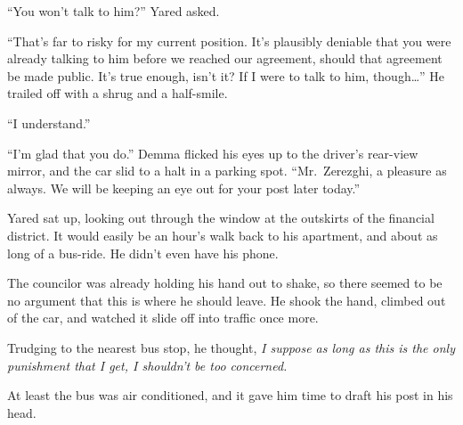 ``You won't talk to him?'' Yared asked.

``That's far to risky for my current position. It's plausibly deniable that you were already talking to him before we reached our agreement, should that agreement be made public. It's true enough, isn't it? If I were to talk to him, though\ldots{}'' He trailed off with a shrug and a half-smile.

``I understand.''

``I'm glad that you do.'' Demma flicked his eyes up to the driver's rear-view mirror, and the car slid to a halt in a parking spot. ``Mr.~Zerezghi, a pleasure as always. We will be keeping an eye out for your post later today.''

Yared sat up, looking out through the window at the outskirts of the financial district. It would easily be an hour's walk back to his apartment, and about as long of a bus-ride. He didn't even have his phone.

The councilor was already holding his hand out to shake, so there seemed to be no argument that this is where he should leave. He shook the hand, climbed out of the car, and watched it slide off into traffic once more.

Trudging to the nearest bus stop, he thought, \emph{I suppose as long as this is the only punishment that I get, I shouldn't be too concerned.}

At least the bus was air conditioned, and it gave him time to draft his post in his head.

